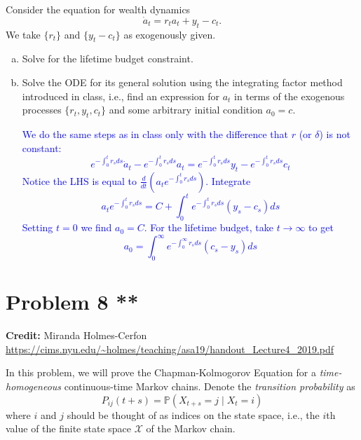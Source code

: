 \documentclass[11pt]{extarticle}
\theoremstyle{plain}
\theoremstyle{definition}
\begin{document}
Consider the equation for wealth dynamics
\begin{equation*}
	\dot a_t = r_t a_t + y_t - c_t.
\end{equation*}
We take $\{r_t\}$ and $\{y_t - c_t\}$ as exogenously given.

\begin{enumerate}[(a)]
\item Solve for the lifetime budget constraint.

\item Solve the ODE for its general solution using the integrating factor method introduced in class, i.e., find an expression for $a_t$ in terms of the exogenous processes $\{r_t, y_t, c_t\}$ and some arbitrary initial condition $a_0 = c$. 

\textcolor{blue}{We do the same steps as in class only with the difference that $r$ (or $\delta$) is not constant: $$e^{-\int_0^t r_s ds}\dot{a}_t
-e^{-\int_0^t r_s ds}a_t = e^{-\int_0^t r_s ds}y_t - e^{-\int_0^t r_s ds} c_t$$ Notice the LHS is equal to $\frac{d}{dt}(a_t e^{-\int_0^t r_s ds})$. Integrate $$a_t e^{-\int_0^t r_s ds} = C+\int_0^t e^{-\int_0^t r_s ds}(y_s-c_s)ds$$ Setting $t=0$ we find $a_0=C$. For the lifetime budget, take $t \rightarrow \infty$ to get $$ a_0= \int_0^\infty e^{-\int_0^\infty r_s ds}(c_s-y_s)ds$$}


\end{enumerate}


\vspace{10mm}
\section*{Problem 8 **}

\textbf{Credit:} Miranda Holmes-Cerfon \url{https://cims.nyu.edu/~holmes/teaching/asa19/handout_Lecture4_2019.pdf}

\vspace{5mm}
\noindent
In this problem, we will prove the Chapman-Kolmogorov Equation for a \textit{time-homogeneous} continuous-time Markov chains. Denote the \textit{transition probability} as
\begin{equation*}
	P_{ij}(t+s) = \mathbb P(X_{t+s} = j \mid X_t = i)
\end{equation*}
where $i$ and $j$ should be thought of as indices on the state space, i.e., the $i$th value of the finite state space $\mathcal X$ of the Markov chain.
\end{document}
